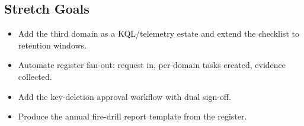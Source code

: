 \subsection*{Stretch Goals}
\begin{itemize}
    \item Add the third domain as a KQL/telemetry estate and extend the checklist to retention windows.
    \item Automate register fan-out: request in, per-domain tasks created, evidence collected.
    \item Add the key-deletion approval workflow with dual sign-off.
    \item Produce the annual fire-drill report template from the register.
\end{itemize}
